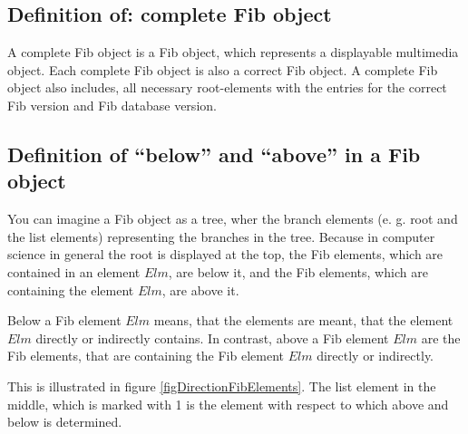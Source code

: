 \subsection{Definition of: complete Fib object}
\label{secFullFibObject}

A complete Fib object is a Fib object, which represents a displayable multimedia object. Each complete Fib object is also a correct Fib object. A complete Fib object also includes, all necessary root-elements with the entries for the correct Fib version and Fib database version.


\subsection{Definition of ``below'' and ``above'' in a Fib object}
\label{secDefinitionUpDown}

You can imagine a Fib object as a tree, wher the branch elements (e. g. root and the list elements) representing the branches in the tree.
Because in computer science in general the root is displayed at the top, the Fib elements, which are contained in an element $Elm$, are below it, and the Fib elements, which are containing the element $Elm$, are above it.

Below a Fib element $Elm$ means, that the elements are meant, that the element $Elm$ directly or indirectly contains.
In contrast, above a Fib element $Elm$ are the Fib elements, that are containing the Fib element $Elm$ directly or indirectly.

This is illustrated in figure \ref{figDirectionFibElements}. The list element in the middle, which is marked with 1 is the element with respect to which above and below is determined.

